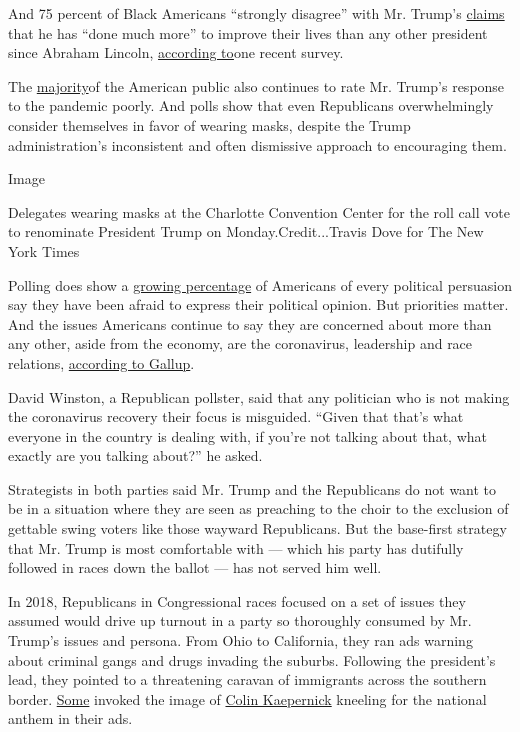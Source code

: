 And 75 percent of Black Americans ``strongly disagree'' with Mr. Trump's
\href{https://twitter.com/realDonaldTrump/status/1268167419132084230?s=20}{claims}
that he has ``done much more'' to improve their lives than any other
president since Abraham Lincoln,
\href{https://navigatorresearch.org/public-opinion-on-coronavirus-navigator-update-36/}{according
to}one recent survey.

The
\href{https://www.pewresearch.org/politics/2020/08/06/views-of-covid-19-response-by-trump-hospitals-cdc-and-other-officials/}{majority}of
the American public also continues to rate Mr. Trump's response to the
pandemic poorly. And polls show that even Republicans overwhelmingly
consider themselves in favor of wearing masks, despite the Trump
administration's inconsistent and often dismissive approach to
encouraging them.

Image

Delegates wearing masks at the Charlotte Convention Center for the roll
call vote to renominate President Trump on Monday.Credit...Travis Dove
for The New York Times

Polling does show a
\href{https://www.cato.org/publications/survey-reports/poll-62-americans-say-they-have-political-views-theyre-afraid-share\#liberals-are-divided-political-expression}{growing
percentage} of Americans of every political persuasion say they have
been afraid to express their political opinion. But priorities matter.
And the issues Americans continue to say they are concerned about more
than any other, aside from the economy, are the coronavirus, leadership
and race relations,
\href{https://news.gallup.com/poll/1675/most-important-problem.aspx}{according
to Gallup}.

David Winston, a Republican pollster, said that any politician who is
not making the coronavirus recovery their focus is misguided. ``Given
that that's what everyone in the country is dealing with, if you're not
talking about that, what exactly are you talking about?'' he asked.

Strategists in both parties said Mr. Trump and the Republicans do not
want to be in a situation where they are seen as preaching to the choir
to the exclusion of gettable swing voters like those wayward
Republicans. But the base-first strategy that Mr. Trump is most
comfortable with --- which his party has dutifully followed in races
down the ballot --- has not served him well.

In 2018, Republicans in Congressional races focused on a set of issues
they assumed would drive up turnout in a party so thoroughly consumed by
Mr. Trump's issues and persona. From Ohio to California, they ran ads
warning about criminal gangs and drugs invading the suburbs. Following
the president's lead, they pointed to a threatening caravan of
immigrants across the southern border.
\href{https://www.nytimes3xbfgragh.onion/2018/11/03/us/politics/republicans-house-races-caravan-voters.html}{Some}
invoked the image of \href{https://youtu.be/9-22S-kFong}{Colin
Kaepernick} kneeling for the national anthem in their ads.

